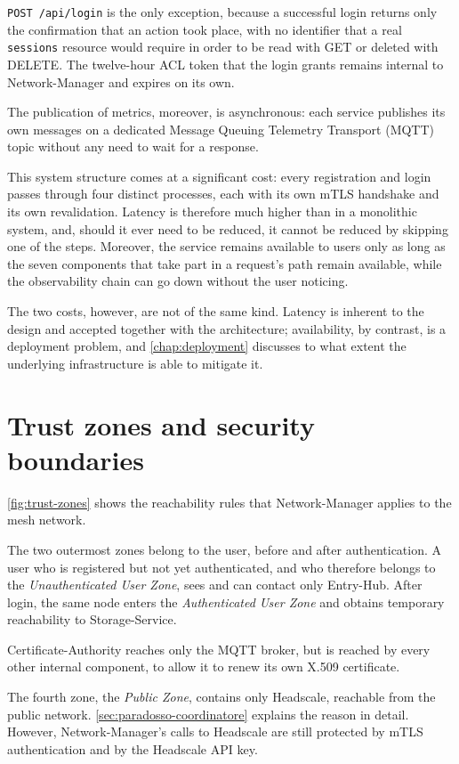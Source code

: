 \texttt{POST /api/login} is the only exception, because a successful login returns only the confirmation that
an action took place, with no identifier that a real \texttt{sessions} resource would require in order to
be read with GET or deleted with DELETE. The twelve-hour ACL token that the login grants remains
internal to Network-Manager and expires on its own.

The publication of metrics, moreover, is asynchronous: each service publishes its own messages on
a dedicated Message Queuing Telemetry Transport (MQTT) topic without any need to wait for a response.

This system structure comes at a significant cost: every registration and login passes through
four distinct processes, each with its own mTLS handshake and its own revalidation.
Latency is therefore much higher than in a monolithic system, and, should it ever need to be reduced, it cannot be
reduced by skipping one of the steps. Moreover, the service remains available to users only as long as
the seven components that take part in a request's path remain available, while the
observability chain can go down without the user noticing.

The two costs, however, are not of the same kind. Latency is inherent to the design and accepted together
with the architecture; availability, by contrast, is a deployment problem, and
\autoref{chap:deployment} discusses to what extent the underlying infrastructure is able to mitigate it.

\section{Trust zones and security boundaries}
\label{sec:trust-zones}

\autoref{fig:trust-zones} shows the reachability rules that Network-Manager applies to the mesh network.

The two outermost zones belong to the user, before and after authentication. A user who is registered but
not yet authenticated, and who therefore belongs to the \emph{Unauthenticated User Zone}, sees and can contact
only Entry-Hub. After login, the same node enters the \emph{Authenticated User Zone} and obtains
temporary reachability to Storage-Service.

Certificate-Authority reaches only the MQTT broker, but is reached by every other
internal component, to allow it to renew its own X.509 certificate.

The fourth zone, the \emph{Public Zone}, contains only Headscale, reachable from the public
network. \autoref{sec:paradosso-coordinatore} explains the reason in detail. However,
Network-Manager's calls to Headscale are still protected by mTLS authentication and
by the Headscale API key.

